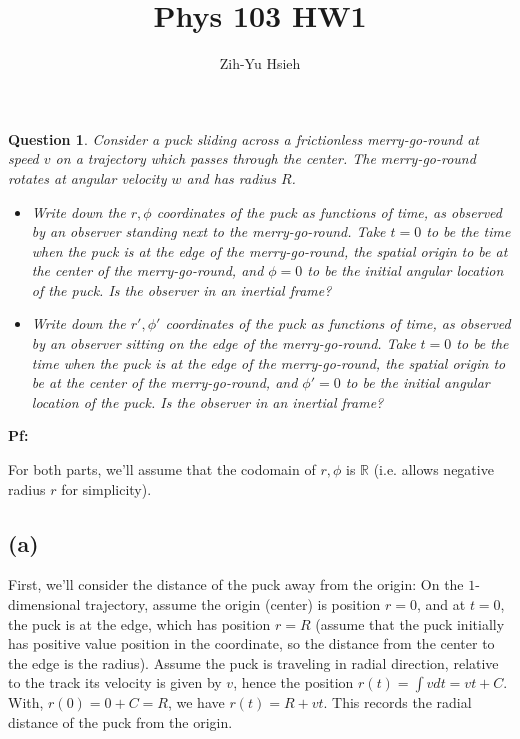 \documentclass{article}
\title{Phys 103 HW1}
\author{Zih-Yu Hsieh}
\newtheorem{question}{Question}
\newcommand{\RR}{\mathbb{R}}
\begin{document}
\maketitle

\section{}%
\begin{question}\label{q1}
    Consider a puck sliding across a frictionless merry-go-round at speed $v$ on a trajectory which passes through the center. The merry-go-round rotates at angular velocity $w$ and has radius $R$.
    \begin{itemize}
        \item[(a)] Write down the $r,\phi$ coordinates of the puck as functions of time, as observed by an observer standing next to the merry-go-round. Take $t=0$ to be the time when the puck is at the edge of the merry-go-round, the spatial origin to be at the center of the merry-go-round, and $\phi=0$ to be the initial angular location of the puck. Is the observer in an inertial frame?
        \item[(b)] Write down the $r', \phi'$ coordinates of the puck as functions of time, as observed by an observer sitting on the edge of the merry-go-round. Take $t=0$ to be the time when the puck is at the edge of the merry-go-round, the spatial origin to be at the center of the merry-go-round, and $\phi'=0$ to be the initial angular location of the puck. Is the observer in an inertial frame?
    \end{itemize}
\end{question}

\textbf{Pf:}

For both parts, we'll assume that the codomain of $r,\phi$ is $\RR$ (i.e. allows negative radius $r$ for simplicity).
\subsection*{(a)}
First, we'll consider the distance of the puck away from the origin: On the $1$-dimensional trajectory, assume the origin (center) is position $r=0$, and at $t=0$, the puck is at the edge, which has position $r=R$ (assume that the puck initially has positive value position in the coordinate, so the distance from the center to the edge is the radius). Assume the puck is traveling in radial direction, relative to
 the track its velocity is given by $v$, hence the position $r(t) = \int vdt = vt+C$. With, $r(0) = 0+C = R$, we have $r(t)=R+vt$. This records the radial distance of the puck from the origin.
\end{document}
